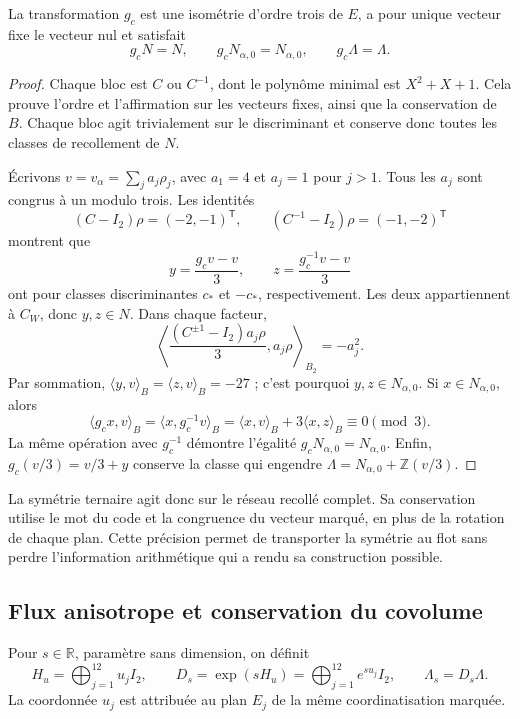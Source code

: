 \begin{proposition}
\label{prop:leech-c3}
La transformation \(g_c\) est une isométrie d’ordre trois de \(E\),
a pour unique vecteur fixe le vecteur nul et satisfait
\[
 g_cN=N,\qquad g_cN_{\alpha,0}=N_{\alpha,0},
 \qquad g_c\Lambda=\Lambda.
\]
\end{proposition}
\begin{proof}
Chaque bloc est \(C\) ou \(C^{-1}\), dont le polynôme minimal est \(X^2+X+1\). Cela prouve l'ordre et l'affirmation sur les vecteurs fixes, ainsi que la conservation de \(B\). Chaque bloc agit trivialement sur le discriminant et conserve donc toutes les classes de recollement de \(N\).

Écrivons \(v=v_\alpha=\sum_j a_j\rho_j\), avec \(a_1=4\) et
\(a_j=1\) pour \(j>1\). Tous les \(a_j\) sont congrus à un
modulo trois. Les identités
\[
 (C-I_2)\rho=(-2,-1)^{\mathsf T},
 \qquad (C^{-1}-I_2)\rho=(-1,-2)^{\mathsf T}
\]
montrent que
\[
 y=\frac{g_cv-v}{3},\qquad z=\frac{g_c^{-1}v-v}{3}
\]
ont pour classes discriminantes \(c_*\) et \(-c_*\), respectivement.
Les deux appartiennent à \(C_W\), donc \(y,z\in N\). Dans chaque facteur,
\[
 \left\langle
 \frac{(C^{\pm1}-I_2)a_j\rho}{3},a_j\rho
 \right\rangle_{B_2}=-a_j^2.
\]
Par sommation, \(\langle y,v\rangle_B=\langle z,v\rangle_B=-27\) ;
c’est pourquoi \(y,z\in N_{\alpha,0}\).
Si \(x\in N_{\alpha,0}\), alors
\[
 \langle g_cx,v\rangle_B
  =\langle x,g_c^{-1}v\rangle_B
  =\langle x,v\rangle_B+3\langle x,z\rangle_B
  \equiv0\pmod3.
\]
La même opération avec \(g_c^{-1}\) démontre l’égalité
\(g_cN_{\alpha,0}=N_{\alpha,0}\). Enfin,
\(g_c(v/3)=v/3+y\) conserve la classe qui engendre
\(\Lambda=N_{\alpha,0}+\mathbb Z(v/3)\).
\end{proof}

La symétrie ternaire agit donc sur le réseau
recollé complet. Sa conservation utilise le mot du code et
la congruence du vecteur marqué, en plus de la rotation de chaque
plan. Cette précision permet de transporter la symétrie au flot sans
perdre l’information arithmétique qui a rendu sa construction possible.

\subsection{Flux anisotrope et conservation du covolume}
\label{subsec:leech-flow}

\begin{definition}
Pour \(s\in\mathbb R\), paramètre sans dimension, on définit
\begin{equation}
 H_u=\bigoplus_{j=1}^{12}u_jI_2,\qquad
 D_s=\exp(sH_u)=\bigoplus_{j=1}^{12}e^{su_j}I_2,\qquad
 \Lambda_s=D_s\Lambda.
 \label{eq:leech-flow}
\end{equation}
La coordonnée \(u_j\) est attribuée au plan \(E_j\) de la même coordinatisation marquée.
\end{definition}

